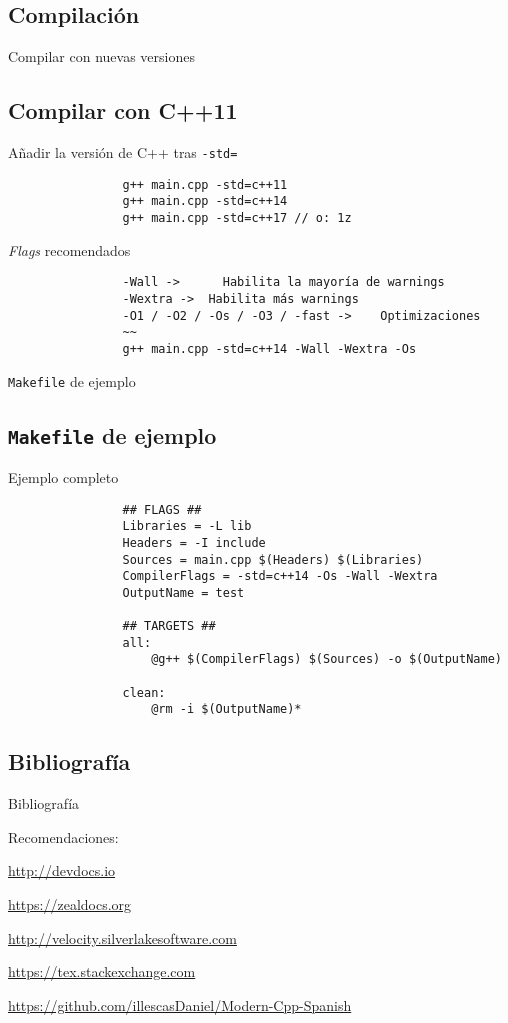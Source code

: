 \documentclass{beamer}
\newcommand{\normalSizeItem}[1] {
  \normalsize{\item #1}
}
\newcommand{\newFrameWithoutIndex}[1]{
	\begin{frame}
		#1
		\thispagestyle{empty}
	\end{frame}
}
\newcommand{\newSectionWithoutIndex}[1]{
	\newFrameWithoutIndex{\section{#1}}
}
\newcommand{\urlItem}[1]{
	\footnotesize{\item {\url {#1}}}
}
\begin{document}
	\newSectionWithoutIndex{Compilación}	
  
		\begin{frame}[fragile]{Compilar con nuevas versiones}	
			\subsection{Compilar con C++11}
			\begin{itemize}
			
				\normalSizeItem {Añadir la versión de C++ tras \texttt{-std=}}
				\begin{lstlisting}
				g++ main.cpp -std=c++11
				g++ main.cpp -std=c++14
				g++ main.cpp -std=c++17 // o: 1z
				\end{lstlisting}
				
				\normalSizeItem {\textit{Flags} recomendados}
				\begin{lstlisting}
				-Wall ->	  Habilita la mayoría de warnings
				-Wextra ->	Habilita más warnings
				-O1 / -O2 / -Os / -O3 / -fast ->	Optimizaciones
				~~
				g++ main.cpp -std=c++14 -Wall -Wextra -Os
				\end{lstlisting}
				
			\end{itemize}
		\end{frame}
		
		\begin{frame}[fragile]{\texttt{Makefile} de ejemplo}	
			\subsection{\texttt{Makefile} de ejemplo}
			\begin{itemize}
			
				\normalSizeItem {Ejemplo completo}
				\begin{lstlisting}
				## FLAGS ##
				Libraries = -L lib
				Headers = -I include
				Sources = main.cpp $(Headers) $(Libraries)
				CompilerFlags = -std=c++14 -Os -Wall -Wextra
				OutputName = test
				
				## TARGETS ##
				all: 
					@g++ $(CompilerFlags) $(Sources) -o $(OutputName)
				
				clean:
					@rm -i $(OutputName)*
				\end{lstlisting}
				
			\end{itemize}
		\end{frame}
		
	\newSectionWithoutIndex{Bibliografía}	
		\tiny
		\begin{frame}[allowframebreaks]{Bibliografía}
			
			
			\vspace{0.5cm}
			\small
			Recomendaciones:
			\begin{itemize}
				\urlItem{http://devdocs.io}
				\urlItem{https://zealdocs.org}
				\urlItem{http://velocity.silverlakesoftware.com}
				\urlItem{https://tex.stackexchange.com}
				\urlItem{https://github.com/illescasDaniel/Modern-Cpp-Spanish}
			\end{itemize}
		\end{frame}
\end{document}
